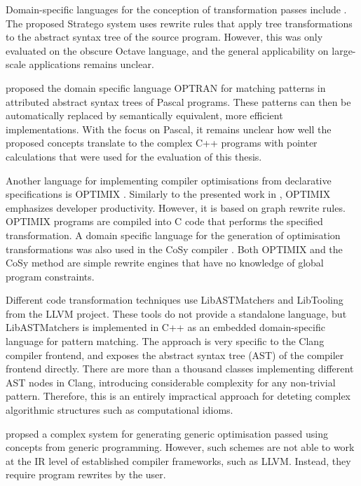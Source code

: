     Domain-specific languages for the conception of transformation passes
    include \citet{Olmos:2005:CSD:2136624.2136643}.
    The proposed Stratego system uses rewrite rules that apply tree
    transformations to the abstract syntax tree of the source program.
    However, this was only evaluated on the obscure Octave language, and the
    general applicability on large-scale applications remains unclear.

    \citet{Lipps1989} proposed the domain specific language OPTRAN for matching
    patterns in attributed abstract syntax trees of Pascal programs.
    These patterns can then be automatically replaced by semantically
    equivalent, more efficient implementations.
    With the focus on Pascal, it remains unclear how well the proposed concepts
    translate to the complex C++ programs with pointer calculations that were
    used for the evaluation of this thesis.

    Another language for implementing compiler optimisations from
    declarative specifications is OPTIMIX \citep{Assmann1996,Assmann98optimix}.
    Similarly to the presented work in , OPTIMIX emphasizes
    developer productivity.
    However, it is based on graph rewrite rules.
    OPTIMIX programs are compiled into C code that performs the specified
    transformation.
    A domain specific language for the generation of optimisation
    transformations was also used in the CoSy compiler \citep{Alt1994}.
    Both OPTIMIX and the CoSy method are simple rewrite engines that have no
    knowledge of global program constraints.

    Different code transformation techniques use LibASTMatchers
    and LibTooling \citep{be0fa11ddb194bde86a9dab8589b779c} from the
    LLVM project.
    These tools do not provide a standalone language, but LibASTMatchers is
    implemented in C++ as an embedded domain-specific language for pattern
    matching.
    The approach is very specific to the Clang compiler frontend, and exposes
    the abstract syntax tree (AST) of the compiler frontend directly.
    There are more than a thousand classes implementing different AST nodes in
    Clang, introducing considerable complexity for any non-trivial pattern.
    Therefore, this is an entirely impractical approach for deteting complex
    algorithmic structures such as computational idioms.

    \citet{Willcock:2009:RGP:1621607.1621611} propsed a complex system for
    generating generic optimisation passed using concepts from generic
    programming.
    However, such schemes are not able to work at the IR level of established
    compiler frameworks, such as LLVM.
    Instead, they require program rewrites by the user.

